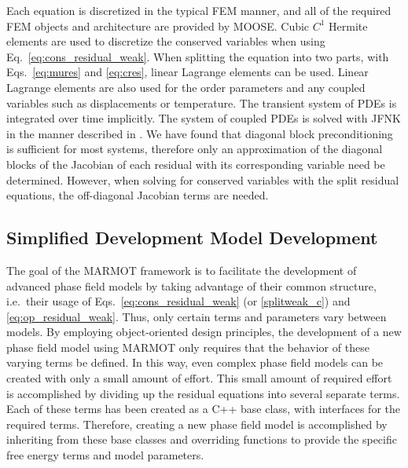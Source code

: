 \documentclass[letter,12pt,fleqn]{article}
\begin{document}
Each equation is discretized in the typical FEM manner, and all of the required FEM objects and architecture are provided by MOOSE.  Cubic $C^1$ Hermite elements are used to discretize the conserved variables when using Eq.~\eqref{eq:cons_residual_weak}. When splitting the equation into two parts, with Eqs.~\eqref{eq:mures} and \eqref{eq:cres}, linear Lagrange elements can be used. Linear Lagrange elements are also used for the order parameters and any coupled variables such as displacements or temperature.  The transient system of PDEs is integrated over time implicitly. The system of coupled PDEs is solved with JFNK in the manner described in \citet{gaston08}.  We have found that diagonal block preconditioning is sufficient for most systems, therefore only an approximation of the diagonal blocks of the Jacobian of each residual with its corresponding variable need be determined. However, when solving for conserved variables with the split residual equations, the off-diagonal Jacobian terms are needed.


\subsection{Simplified Development Model Development}

The goal of the MARMOT framework is to facilitate the development of advanced phase field models by taking advantage of their common structure, i.e.\ their usage of Eqs.~\eqref{eq:cons_residual_weak} (or \eqref{splitweak_c}) and \eqref{eq:op_residual_weak}.  Thus, only certain terms and parameters vary between models. By employing object-oriented design principles, the development of a new phase field model using MARMOT only requires that the behavior of these varying terms be defined.  In this way, even complex phase field models can be created with only a small amount of effort.  This small amount of required effort is accomplished by dividing up the residual equations into several separate terms.  Each of these terms has been created as a C++ base class, with interfaces for the required terms.  Therefore, creating a new phase field model is accomplished by inheriting from these base classes and overriding functions to provide the specific free energy terms and model parameters.
\end{document}

